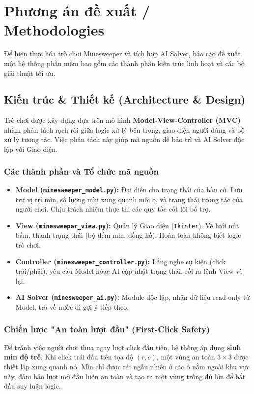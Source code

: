 \section{Phương án đề xuất / Methodologies}

Để hiện thực hóa trò chơi Minesweeper và tích hợp AI Solver, báo cáo đề xuất một hệ thống phần mềm bao gồm các thành phần kiến trúc linh hoạt và các bộ giải thuật tối ưu.

\subsection{Kiến trúc \& Thiết kế (Architecture \& Design)}

Trò chơi được xây dựng dựa trên mô hình \textbf{Model-View-Controller (MVC)} nhằm phân tách rạch ròi giữa logic xử lý bên trong, giao diện người dùng và bộ xử lý tương tác. Việc phân tách này giúp mã nguồn dễ bảo trì và AI Solver độc lập với Giao diện.

\subsubsection{Các thành phần và Tổ chức mã nguồn}
\begin{itemize}
    \item \textbf{Model (\texttt{minesweeper\_model.py}):} Đại diện cho trạng thái của bàn cờ. Lưu trữ vị trí mìn, số lượng mìn xung quanh mỗi ô, và trạng thái tương tác của người chơi. Chịu trách nhiệm thực thi các quy tắc cốt lõi bổ trợ.
    \item \textbf{View (\texttt{minesweeper\_view.py}):} Quản lý Giao diện (\texttt{Tkinter}). Vẽ lưới nút bấm, thanh trạng thái (bộ đếm mìn, đồng hồ). Hoàn toàn không biết logic trò chơi.
    \item \textbf{Controller (\texttt{minesweeper\_controller.py}):} Lắng nghe sự kiện (click trái/phải), yêu cầu Model hoặc AI cập nhật trạng thái, rồi ra lệnh View vẽ lại.
    \item \textbf{AI Solver (\texttt{minesweeper\_ai.py}):} Module độc lập, nhận dữ liệu read-only từ Model, trả về nước đi gợi ý tiếp theo.
\end{itemize}

\subsubsection{Chiến lược "An toàn lượt đầu" (First-Click Safety)}
Để tránh việc người chơi thua ngay lượt click đầu tiên, hệ thống áp dụng \textbf{sinh mìn độ trễ}. Khi click trái đầu tiên tọa độ $(r, c)$, một vùng an toàn $3 \times 3$ được thiết lập xung quanh nó. Mìn chỉ được rải ngẫu nhiên ở các ô nằm ngoài khu vực này, đảm bảo lượt mở đầu luôn an toàn và tạo ra một vùng trống đủ lớn để bắt đầu suy luận logic.

